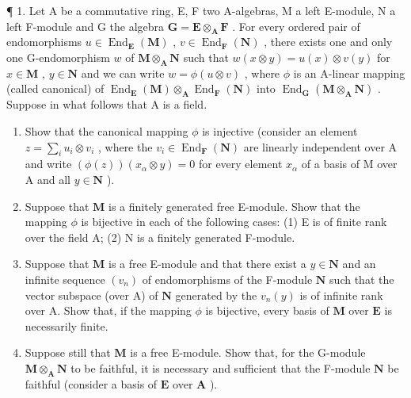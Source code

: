 \BourbakiExercisesSection

¶ 1. Let A be a commutative ring, E, F two A-algebras, M a left E-module, N a left F-module and G the algebra \(\mathbf{G} = \mathbf{E} \otimes_{\mathbf{A}} \mathbf{F}\) . For every ordered pair of endomorphisms \(u \in \operatorname{End}_{\mathbf{E}}(\mathbf{M})\) , \(v \in \operatorname{End}_{\mathbf{F}}(\mathbf{N})\) , there exists one and only one G-endomorphism \(w\) of \(\mathbf{M} \otimes_{\mathbf{A}} \mathbf{N}\) such that \(w(x \otimes y) = u(x) \otimes v(y)\) for \(x \in \mathbf{M}\) , \(y \in \mathbf{N}\) and we can write \(w = \phi(u \otimes v)\) , where \(\phi\) is an A-linear mapping (called canonical) of \(\operatorname{End}_{\mathbf{E}}(\mathbf{M}) \otimes_{\mathbf{A}} \operatorname{End}_{\mathbf{F}}(\mathbf{N})\) into \(\operatorname{End}_{\mathbf{G}}(\mathbf{M} \otimes_{\mathbf{A}} \mathbf{N})\) . Suppose in what follows that A is a field.

\begin{enumerate}
\def\labelenumi{(\alph{enumi})}
\item
  Show that the canonical mapping \(\phi\) is injective (consider an element \(z = \sum_{i} u_{i} \otimes v_{i}\) , where the \(v_{i} \in \operatorname{End}_{\mathbf{F}}(\mathbf{N})\) are linearly independent over A and write \((\phi(z))(x_{\alpha} \otimes y) = 0\) for every element \(x_{\alpha}\) of a basis of M over A and all \(y \in \mathbf{N}\) ).
\item
  Suppose that \(\mathbf{M}\) is a finitely generated free E-module. Show that the mapping \(\phi\) is bijective in each of the following cases: (1) E is of finite rank over the field A; (2) N is a finitely generated F-module.
\item
  Suppose that \(\mathbf{M}\) is a free E-module and that there exist a \(y \in \mathbf{N}\) and an infinite sequence \((v_n)\) of endomorphisms of the F-module \(\mathbf{N}\) such that the vector subspace (over A) of \(\mathbf{N}\) generated by the \(v_n(y)\) is of infinite rank over A. Show that, if the mapping \(\phi\) is bijective, every basis of \(\mathbf{M}\) over \(\mathbf{E}\) is necessarily finite.
\item
  Suppose still that \(\mathbf{M}\) is a free E-module. Show that, for the G-module \(\mathbf{M} \otimes_{\mathbf{A}} \mathbf{N}\) to be faithful, it is necessary and sufficient that the F-module \(\mathbf{N}\) be faithful (consider a basis of \(\mathbf{E}\) over \(\mathbf{A}\) ).
\end{enumerate}


